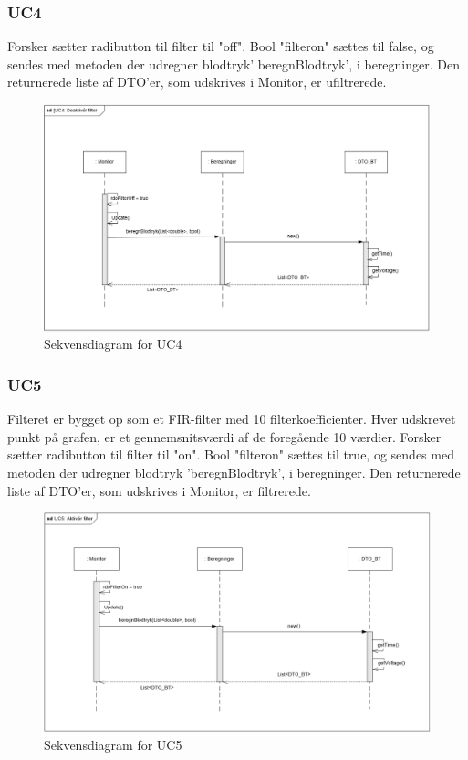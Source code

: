 \subsubsection{UC4}
Forsker sætter radibutton til filter til "off".
Bool "filteron" sættes til false, og sendes med metoden der udregner blodtryk' beregnBlodtryk', i beregninger. Den returnerede liste af DTO'er, som udskrives i Monitor, er ufiltrerede.

\begin{figure}[H]
	\centering
	\includegraphics[width=1\textwidth]{Figurer/UC4_SD_SW}
	\caption{Sekvensdiagram for UC4}
\end{figure}

\subsubsection{UC5}
Filteret er bygget op som et FIR-filter med 10 filterkoefficienter. Hver udskrevet punkt på grafen, er et gennemsnitsværdi af de foregående 10 værdier.
Forsker sætter radibutton til filter til "on".
Bool "filteron" sættes til true, og sendes med metoden der udregner blodtryk 'beregnBlodtryk', i beregninger. Den returnerede liste af DTO'er, som udskrives i Monitor, er filtrerede.

\begin{figure}[H]
	\centering
	\includegraphics[width=1\textwidth]{Figurer/UC5_SD_SW}
	\caption{Sekvensdiagram for UC5}
\end{figure}

